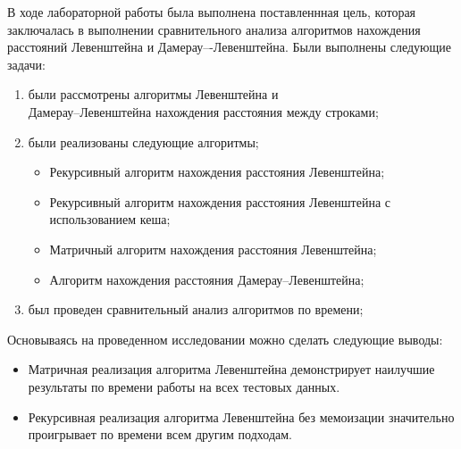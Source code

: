 

В ходе лабораторной работы была выполнена поставленнная цель, которая заключалась в выполнении сравнительного анализа алгоритмов нахождения расстояний Левенштейна и Дамерау–-Левенштейна.
Были выполнены следующие задачи:
\begin{enumerate}
	\item были рассмотрены алгоритмы Левенштейна и \\ Дамерау--Левенштейна нахождения расстояния между строками;
	\item были реализованы следующие алгоритмы;
	\begin{itemize}
		\item Рекурсивный алгоритм нахождения расстояния Левенштейна;
		\item Рекурсивный алгоритм нахождения расстояния Левенштейна с использованием кеша;
		\item Матричный алгоритм нахождения расстояния Левенштейна;
		\item Алгоритм нахождения расстояния Дамерау--Левенштейна;
	\end{itemize}
	\item был проведен сравнительный анализ алгоритмов по времени;
\end{enumerate}


Основываясь на проведенном исследовании можно сделать следующие выводы:
\begin{itemize}
	\item{Матричная реализация алгоритма Левенштейна демонстрирует наилучшие результаты по времени работы на всех тестовых данных.}
	\item{Рекурсивная реализация алгоритма Левенштейна без мемоизации значительно проигрывает по времени всем другим подходам.}
\end{itemize}
